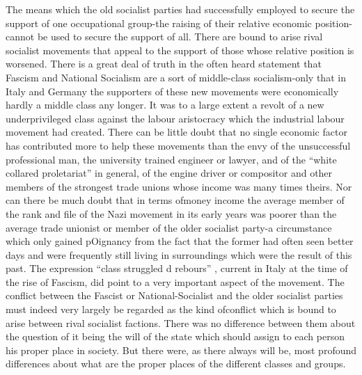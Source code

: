 \documentclass[11pt,openany]{book}
\begin{document}
The means which the old socialist parties had successfully employed to secure the support of one occupational group-the raising of their relative economic position-cannot be used to secure the support of all. There are bound to arise rival socialist movements that appeal to the support of those whose relative position is worsened. There is a great deal of truth in the often heard statement that Fascism and National Socialism are a sort of middle-class socialism-only that in Italy and Germany the supporters of these new movements were economically hardly a middle class any longer. It was to a large extent a revolt of a new underprivileged class against the labour aristocracy which the industrial labour movement had created. There can be little doubt that no single economic factor has contributed more to help these movements than the envy of the unsuccessful professional man, the university trained engineer or lawyer, and of the ``white collared proletariat'' in general, of the engine driver or compositor and other members of the strongest trade unions whose income was many times theirs. Nor can there be much doubt that in terms ofmoney income the average member of the rank and file of the Nazi movement in its early years was poorer than the average trade unionist or member of the older socialist party-a circumstance which only gained pOignancy from the fact that the former had often seen better days and were frequently still living in surroundings which were the result of this past. The expression ``class struggled d rebours'' , current in Italy at the time of the rise of Fascism, did point to a very important aspect of the movement. The conflict between the Fascist or National-Socialist and the older socialist parties must indeed very largely be regarded as the kind ofconflict which is bound to arise between rival socialist factions. There was no difference between them about the question of it being the will of the state which should assign to each person his proper place in society. But there were, as there always will be, most profound differences about what are the proper places of the different classes and groups.

\begin{center}\textasteriskcentered\hspace{0.9em}\textasteriskcentered\hspace{0.9em}\textasteriskcentered\end{center}

\begin{center}\textasteriskcentered\hspace{0.9em}\textasteriskcentered\hspace{0.9em}\textasteriskcentered\end{center}
\end{document}
